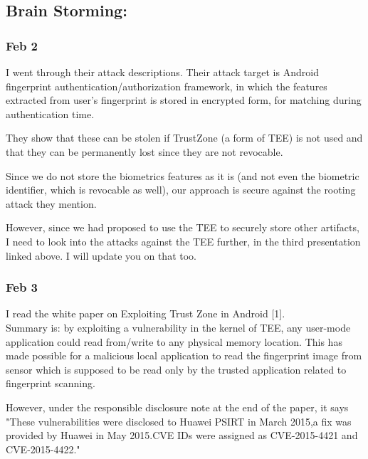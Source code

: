 \documentclass[11pt]{article}
\begin{document}
\subsection*{Brain Storming:}

\subsubsection*{Feb 2}
I went through their attack descriptions. Their attack target is Android fingerprint authentication/authorization framework, in which the features 
extracted from user's fingerprint is stored in encrypted form, for matching during authentication time. 

They show that these can be stolen if TrustZone (a form of TEE) is not used and that they can be permanently lost since they are not revocable.

Since we do not store the biometrics features as it is (and not even the biometric identifier, which is revocable as well), our approach is secure 
against the rooting attack they mention.

However, since we had proposed to use the TEE to securely store other artifacts, I need to look into the attacks against the TEE further, in the third 
presentation linked above. I will update you on that too.

\subsubsection*{Feb 3}
I read the white paper on Exploiting Trust Zone in Android [1].\\
Summary is: by exploiting a vulnerability in the kernel of TEE, any user-mode application could read from/write to any physical memory location. This 
has made possible for a malicious local application to read the fingerprint image from sensor which is supposed to be read only by the trusted 
application related to fingerprint scanning.

However, under the responsible disclosure note at the end of the paper, it says "These vulnerabilities were disclosed to Huawei PSIRT in March 2015,a 
fix was provided by Huawei in May 2015.CVE IDs were assigned as CVE-2015-4421 and CVE-2015-4422."
\end{document}

